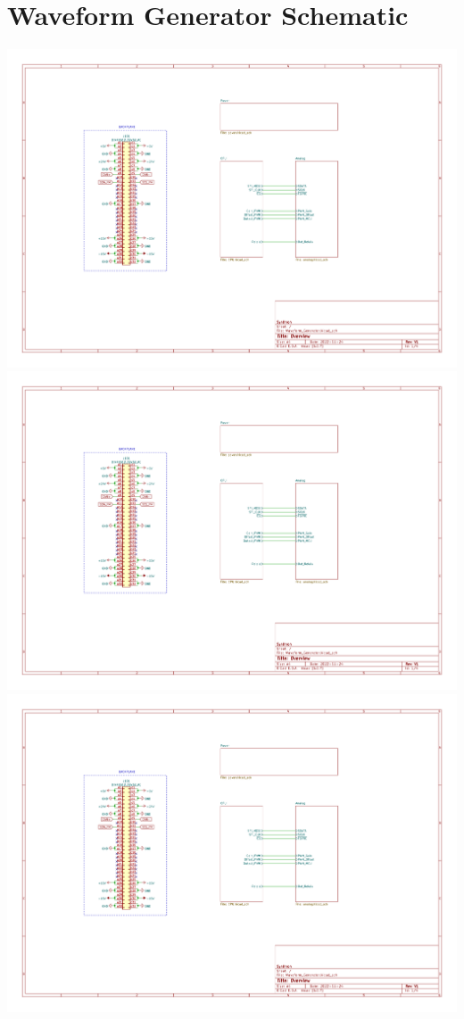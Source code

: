 \documentclass[11pt, a4paper, listof=numbered, captions=tableheading, headinclude, table, xcdraw]{scrreprt}
\begin{document}
\chapter{Waveform Generator Schematic}
\includegraphics[page=1,angle=90,width=\textwidth]{schematics/Waveform_Generator.pdf}\newpage
\includegraphics[page=2,angle=90,width=\textwidth]{schematics/Waveform_Generator.pdf}\newpage
\includegraphics[page=3,angle=90,width=\textwidth]{schematics/Waveform_Generator.pdf}\newpage
\end{document}
